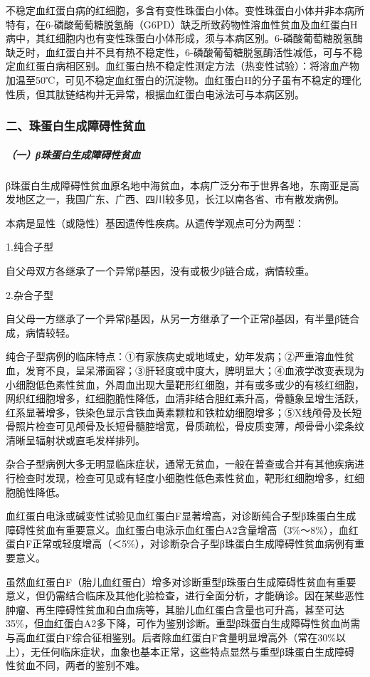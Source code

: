 不稳定血红蛋白病的红细胞，多含有变性珠蛋白小体。变性珠蛋白小体并非本病所特有，在6-磷酸葡萄糖脱氢酶（G6PD）缺乏所致药物性溶血性贫血及血红蛋白H病中，其红细胞内也有变性珠蛋白小体形成，须与本病区别。6-磷酸葡萄糖脱氢酶缺乏时，血红蛋白并不具有热不稳定性，6-磷酸葡萄糖脱氢酶活性减低，可与不稳定血红蛋白病相区别。血红蛋白热不稳定性测定方法（热变性试验）：将溶血产物加温至50℃，可见不稳定血红蛋白的沉淀物。血红蛋白H的分子虽有不稳定的理化性质，但其肽链结构并无异常，根据血红蛋白电泳法可与本病区别。

\subsubsection{二、珠蛋白生成障碍性贫血}

\subparagraph{（一）β珠蛋白生成障碍性贫血}

β珠蛋白生成障碍性贫血原名地中海贫血，本病广泛分布于世界各地，东南亚是高发地区之一，我国广东、广西、四川较多见，长江以南各省、市有散发病例。

本病是显性（或隐性）基因遗传性疾病。从遗传学观点可分为两型：

1.纯合子型%

自父母双方各继承了一个异常β基因，没有或极少β链合成，病情较重。

2.杂合子型%

自父母一方继承了一个异常β基因，从另一方继承了一个正常β基因，有半量β链合成，病情较轻。

纯合子型病例的临床特点：①有家族病史或地域史，幼年发病；②严重溶血性贫血，发育不良，呈呆滞面容；③肝轻度或中度大，脾明显大；④血液学改变表现为小细胞低色素性贫血，外周血出现大量靶形红细胞，并有或多或少的有核红细胞，网织红细胞增多，红细胞脆性降低，血清非结合胆红素升高，骨髓象呈增生活跃，红系显著增多，铁染色显示含铁血黄素颗粒和铁粒幼细胞增多；⑤X线颅骨及长短骨照片检查可见颅骨及长短骨髓腔增宽，骨质疏松，骨皮质变薄，颅骨骨小梁条纹清晰呈辐射状或直毛发样排列。

杂合子型病例大多无明显临床症状，通常无贫血，一般在普查或合并有其他疾病进行检查时发现，检查可见或有轻度小细胞性低色素性贫血，靶形红细胞增多，红细胞脆性降低。

血红蛋白电泳或碱变性试验见血红蛋白F显著增高，对诊断纯合子型β珠蛋白生成障碍性贫血有重要意义。血红蛋白电泳示血红蛋白A2含量增高（3\%～8\%），血红蛋白F正常或轻度增高（＜5\%），对诊断杂合子型β珠蛋白生成障碍性贫血病例有重要意义。

虽然血红蛋白F（胎儿血红蛋白）增多对诊断重型β珠蛋白生成障碍性贫血有重要意义，但仍需结合临床及其他化验检查，进行全面分析，才能确诊。因在某些恶性肿瘤、再生障碍性贫血和白血病等，其胎儿血红蛋白含量也可升高，甚至可达35\%，但血红蛋白A2多下降，可作为鉴别诊断。重型β珠蛋白生成障碍性贫血尚需与高血红蛋白F综合征相鉴别。后者除血红蛋白F含量明显增高外（常在30\%以上），无任何临床症状，血象也基本正常，这些特点显然与重型β珠蛋白生成障碍性贫血不同，两者的鉴别不难。

